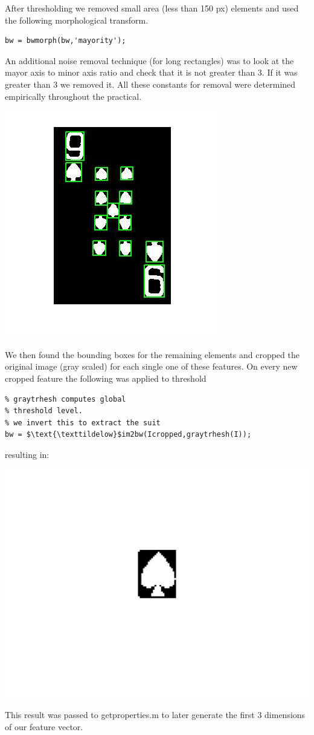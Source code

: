\documentclass[11pt]{article}
\theoremstyle{plain}
\theoremstyle{definition}
\begin{document}
After thresholding we removed small area (less than 150 px) elements and used the following morphological transform.  
\begin{lstlisting}
bw = bwmorph(bw,'mayority');
\end{lstlisting}
An additional noise removal technique (for long rectangles) was to look at the mayor axis to minor axis ratio and check that
it is not greater than 3. If it was greater than 3 we removed it. All these constants for removal were determined empirically
throughout the practical.
\begin{center}
\includegraphics[scale=0.5]{properties.jpg}
\end{center}
We then found the bounding boxes for the remaining elements and cropped the original image (gray scaled) for each single one of these features. On every new cropped feature the following was applied to threshold
\begin{lstlisting}[mathescape]
% Inverted global threshold 
% graytrhesh computes global
% threshold level.
% we invert this to extract the suit
bw = $\text{\texttildelow}$im2bw(Icropped,graytrhesh(I));
\end{lstlisting}
resulting in: 
\begin{center}
\includegraphics[scale=0.09]{spade_small.jpg}
\end{center}
This result was passed to getproperties.m to later generate the first 3 dimensions of our feature vector.
\end{document}
